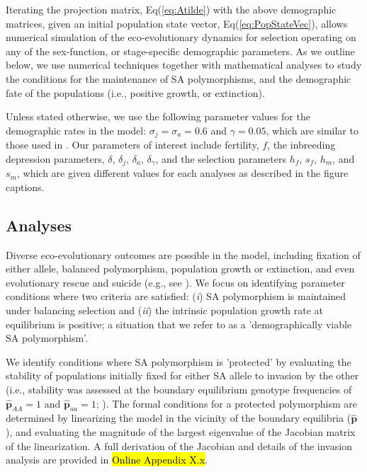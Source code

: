 \documentclass[11pt]{article}
\def\mbf#1{\mathbf{#1}}
\begin{document}
Iterating the projection matrix, Eq(\ref{eq:Atilde}) with the above demographic matrices, given an initial population state vector, Eq(\ref{eq:PopStateVec}), allows numerical simulation of the eco-evolutionary dynamics for selection operating on any of the sex-function, or stage-specific demographic parameters. As we outline below, we use numerical techniques together with mathematical analyses to study the conditions for the maintenance of SA polymorphisms, and the demographic fate of the populations (i.e., positive growth, or extinction).

Unless stated otherwise, we use the following parameter values for the demographic rates in the model: $\sigma_j = \sigma_a = 0.6$ and $\gamma = 0.05$, which are similar to those used in \citet{deVriesCaswell2019b}. Our parameters of interest include fertility, $f$, the inbreeding depression parameters, $\delta$, $\delta_j$, $\delta_a$, $\delta_{\gamma}$, and the selection parameters $h_f$, $s_f$, $h_m$, and $s_m$, which are given different values for each analyses as described in the figure captions.

\subsection{Analyses} \label{subsec:analyses}

Diverse eco-evolutionary outcomes are possible in the model, including fixation of either allele, balanced polymorphism, population growth or extinction, and even evolutionary rescue and suicide (e.g., see \citealt{CaswellEtAl2018,deVriesCaswell2019a,deVriesCaswell2019b}). We focus on identifying parameter conditions where two criteria are satisfied: ({\itshape i}) SA polymorphism is maintained under balancing selection and ({\itshape ii}) the intrinsic population growth rate at equilibrium is positive; a situation that we refer to as a 'demographically viable SA polymorphism'.

We identify conditions where SA polymorphism is 'protected' by evaluating the stability of populations initially fixed for either SA allele to invasion by the other (i.e., stability was assessed at the boundary equilibrium genotype frequencies of $\hat{\mbf{p}}_{AA} = 1$ and $\hat{\mbf{p}}_{aa} = 1$; \citealt{Levene1953, Prout1968, deVriesCaswell2019b}). The formal conditions for a protected polymorphism are determined by linearizing the model in the vicinity of the boundary equilibria ($\hat{\mbf{p}}$), and evaluating the magnitude of the largest eigenvalue of the Jacobian matrix of the linearization. A full derivation of the Jacobian and details of the invasion analysis are provided in \hl{Online Appendix X.x}.
\end{document}
